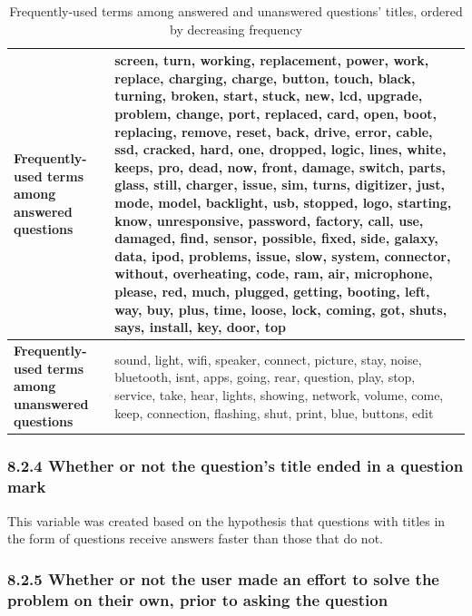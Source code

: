 \documentclass{article}
\begin{document}
\begin{table}[!htbp]
\centering
\begin{tabular}{|p{4cm}|p{8cm}|}
  \hline
 \textbf{Frequently-used terms among answered questions} & screen, turn, working, replacement, power, work, replace, charging, charge, button, touch, black, turning, broken, start, stuck, new, lcd, upgrade, problem, change, port, replaced, card, open, boot, replacing, remove, reset, back, drive, error, cable, ssd, cracked, hard, one, dropped, logic, lines, white, keeps, pro, dead, now, front, damage, switch, parts, glass, still, charger, issue, sim, turns, digitizer, just, mode, model, backlight, usb, stopped, logo, starting, know, unresponsive, password, factory, call, use, damaged, find, sensor, possible, fixed, side, galaxy, data, ipod, problems, issue, slow, system, connector, without, overheating, code, ram, air, microphone, please, red, much, plugged, getting, booting, left, way, buy, plus, time, loose, lock, coming, got, shuts, says, install, key, door, top \\
  \hline
  \textbf{Frequently-used terms among unanswered questions} & sound, light, wifi, speaker, connect, picture, stay, noise, bluetooth, isnt, apps, going, rear, question, play, stop, service, take, hear, lights, showing, network, volume, come, keep, connection, flashing, shut, print, blue, buttons, edit \\ 
   \hline
\end{tabular}
\caption{Frequently-used terms among answered and unanswered questions' titles, ordered by decreasing frequency}
\label{table:frequent_terms}
\end{table}


\subsubsection*{8.2.4 Whether or not the question's title ended in a question mark}

This variable was created based on the hypothesis that questions with titles in the form of questions receive answers faster than those that do not.


\subsubsection*{8.2.5 Whether or not the user made an effort to solve the problem on their own, prior to asking the question}
\end{document}
